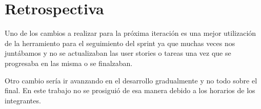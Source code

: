 \section{Retrospectiva}

Uno de los cambios a realizar para la próxima iteración es una mejor utilización
de la herramiento para el seguimiento del sprint ya que muchas veces nos juntábamos
y no se actualizaban las user stories o tareas una vez que se progresaba en las misma o se 
finalzaban.


Otro cambio sería ir avanzando en el desarrollo gradualmente y no todo sobre el final. 
En este trabajo no se prosiguió de esa manera debido a los horarios de los integrantes.



